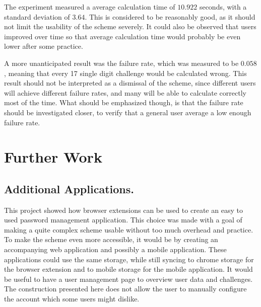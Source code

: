 \par The experiment measured a average calculation time of $10.922$ seconds, with a standard deviation of $3.64$. This is considered to be reasonably good, as it should not limit the usability of the scheme severely. It could also be observed that users improved over time so that average calculation time would probably be even lower after some practice. 
\par A more unanticipated result was the failure rate, which was measured to be $0.058$, meaning that every 17 single digit challenge would be calculated wrong. This result should not be interpreted as a dismissal of the scheme, since different users will achieve different failure rates, and many will be able to calculate correctly most of the time. What should be emphasized though, is that the failure rate should be investigated closer, to verify that a general user average a low enough failure rate. 


\section{Further Work}

\subsection{Additional Applications.}
This project showed how browser extensions can be used to create an easy to used password management application. This choice was made with a goal of making a quite complex scheme usable without too much overhead and practice. To make the scheme even more accessible, it would be by creating an accompanying web application and possibly a mobile application. These applications could use the same storage, while still syncing to chrome storage for the browser extension and to mobile storage for the mobile application. It would be useful to have a user management page to overview user data and challenges. The construction presented here does not allow the user to manually configure the account which some users might dislike. 

